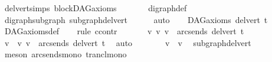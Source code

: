 \begin{isabellebody}
\ del{\isacharunderscore}{\kern0pt}vert{\isacharunderscore}{\kern0pt}simps\ blockDAG{\isacharunderscore}{\kern0pt}axioms\ \isanewline
\ \ \ \ \ \ digraph{\isacharunderscore}{\kern0pt}def\isanewline
\ \ \ \ \isamarkupfalse%
\ digraph{\isacharunderscore}{\kern0pt}subgraph\ subgraph{\isacharunderscore}{\kern0pt}del{\isacharunderscore}{\kern0pt}vert\isanewline
\ \ \ \ \isamarkupfalse%
\ auto\ \isanewline
{}\isamarkupfalse%
\ \isamarkupfalse%
\ {\isachardoublequoteopen}DAG{\isacharunderscore}{\kern0pt}axioms\ {\isacharparenleft}{\kern0pt}del{\isacharunderscore}{\kern0pt}vert\ t{\isacharparenright}{\kern0pt}{\isachardoublequoteclose}\isanewline
\ \ \ \ \isamarkupfalse%
\ DAG{\isacharunderscore}{\kern0pt}axioms{\isacharunderscore}{\kern0pt}def\isanewline
\ \ \isamarkupfalse%
{\isacharparenleft}{\kern0pt}\ rule\ ccontr{\isacharparenright}{\kern0pt}\isanewline
\ \ \ \ \isamarkupfalse%
\ {\isachardoublequoteopen}{\isasymnot}\ {\isacharparenleft}{\kern0pt}{\isasymforall}v{\isachardot}{\kern0pt}\ {\isacharparenleft}{\kern0pt}v{\isacharcomma}{\kern0pt}\ v{\isacharparenright}{\kern0pt}\ {\isasymnotin}\ {\isacharparenleft}{\kern0pt}arcs{\isacharunderscore}{\kern0pt}ends\ {\isacharparenleft}{\kern0pt}del{\isacharunderscore}{\kern0pt}vert\ t{\isacharparenright}{\kern0pt}{\isacharparenright}{\kern0pt}\isactrlsup {\isacharplus}{\kern0pt}{\isacharparenright}{\kern0pt}{\isachardoublequoteclose}\isanewline
\ \ \ \ \isamarkupfalse%
\ \isamarkupfalse%
\ v\ \ {\isachardoublequoteopen}{\isacharparenleft}{\kern0pt}v{\isacharcomma}{\kern0pt}\ v{\isacharparenright}{\kern0pt}\ {\isasymin}\ {\isacharparenleft}{\kern0pt}arcs{\isacharunderscore}{\kern0pt}ends\ {\isacharparenleft}{\kern0pt}del{\isacharunderscore}{\kern0pt}vert\ t{\isacharparenright}{\kern0pt}{\isacharparenright}{\kern0pt}\isactrlsup {\isacharplus}{\kern0pt}{\isachardoublequoteclose}\ \isamarkupfalse%
\ auto\isanewline
\ \ \ \ \isamarkupfalse%
\ \isamarkupfalse%
\ {\isachardoublequoteopen}v\ {\isasymrightarrow}\isactrlsup {\isacharplus}{\kern0pt}\ v{\isachardoublequoteclose}\ \isamarkupfalse%
\ subgraph{\isacharunderscore}{\kern0pt}del{\isacharunderscore}{\kern0pt}vert\isanewline
\ \ \ \ \ \ \isamarkupfalse%
\ {\isacharparenleft}{\kern0pt}meson\ arcs{\isacharunderscore}{\kern0pt}ends{\isacharunderscore}{\kern0pt}mono\ trancl{\isacharunderscore}{\kern0pt}mono{\isacharparenright}{\kern0pt}\ \isanewline

\end{isabellebody}

